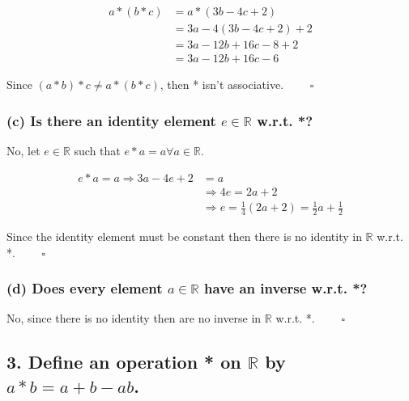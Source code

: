 \documentclass[
]{article}
\begin{document}
\begin{equation}
\label{1b-2}
\begin{split}
a*(b*c) &= a*(3b-4c+2)\\
&= 3a-4(3b-4c+2)+2\\
&= 3a-12b+16c-8+2\\
&= 3a-12b+16c-6
\end{split}
\end{equation}

Since \((a*b)*c\ne a*(b*c)\), then * isn't associative.
\(\quad\quad\square\)

\hypertarget{c-is-there-an-identity-element-ein-mathbbr-w.r.t.}{%
\subsubsection{\texorpdfstring{(c) Is there an identity element
\(e\in \mathbb{R}\) w.r.t.
*?}{(c) Is there an identity element e\textbackslash in \textbackslash mathbb\{R\} w.r.t. *?}}\label{c-is-there-an-identity-element-ein-mathbbr-w.r.t.}}

No, let \(e\in\mathbb{R}\) such that \(e*a=a\forall a\in\mathbb{R}\).

\begin{equation}
\label{1c}
\begin{split}
e*a=a\Rightarrow 3a-4e+2 &= a \\
&\Rightarrow 4e = 2a+2\\
&\Rightarrow e = \frac{1}{4}(2a+2)= \frac{1}{2}a+\frac{1}{2}
\end{split}
\end{equation}

Since the identity element must be constant then there is no identity in
\(\mathbb{R}\) w.r.t. *. \(\quad\quad\square\)

\hypertarget{d-does-every-element-ainmathbbr-have-an-inverse-w.r.t.}{%
\subsubsection{\texorpdfstring{(d) Does every element \(a\in\mathbb{R}\)
have an inverse w.r.t.
*?}{(d) Does every element a\textbackslash in\textbackslash mathbb\{R\} have an inverse w.r.t. *?}}\label{d-does-every-element-ainmathbbr-have-an-inverse-w.r.t.}}

No, since there is no identity then are no inverse in \(\mathbb{R}\)
w.r.t. *. \(\quad\quad \square\)

\hypertarget{define-an-operation-on-mathbbr-by-abab-ab.}{%
\subsection{\texorpdfstring{3. Define an operation * on \(\mathbb{R}\)
by
\(a*b=a+b-ab\).}{3. Define an operation * on \textbackslash mathbb\{R\} by a*b=a+b-ab.}}\label{define-an-operation-on-mathbbr-by-abab-ab.}}
\end{document}
